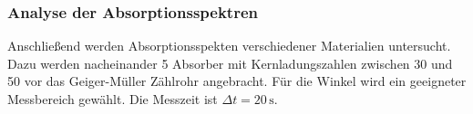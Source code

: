 \subsubsection{Analyse der Absorptionsspektren}
Anschließend werden Absorptionsspekten verschiedener Materialien untersucht. Dazu
werden nacheinander 5 Absorber mit Kernladungszahlen zwischen 30 und 50 vor das
Geiger-Müller Zählrohr angebracht. Für die Winkel wird ein geeigneter Messbereich
gewählt. Die Messzeit ist $\Delta t=20\,\mathrm{s}$. 
\label{sec:Aufbau}
